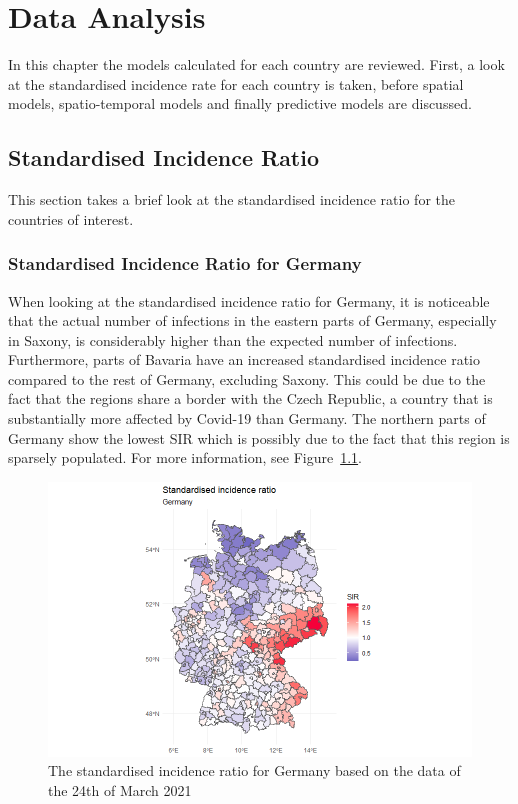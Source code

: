 %
\chapter{Data Analysis}
\label{sec:analysis}
In this chapter the models calculated for each country are reviewed. First, a look at the standardised incidence rate for each country is taken, before spatial models, spatio-temporal models and finally predictive models are discussed.
\section{Standardised Incidence Ratio}
This section takes a brief look at the standardised incidence ratio for the countries of interest.
\subsection{Standardised Incidence Ratio for Germany}
When looking at the standardised incidence ratio for Germany, it is noticeable that the actual number of infections in the eastern parts of Germany, especially in Saxony, is considerably higher than the expected number of infections. Furthermore, parts of Bavaria have an increased standardised incidence ratio compared to the rest of Germany, excluding Saxony. This could be due to the fact that the regions share a border with the Czech Republic, a country that is substantially more affected by Covid-19 than Germany. The northern parts of Germany show the lowest SIR which is possibly due to the fact that this region is sparsely populated. For more information, see Figure~\ref{sirgermany}.
%   
\begin{figure}[H]
  \centering
  \includegraphics[width = 1.2\textwidth]{sir_germany.png}
  \caption{The standardised incidence ratio for Germany based on the data of the 24th of March 2021}
  \label{sirgermany}
\end{figure}
